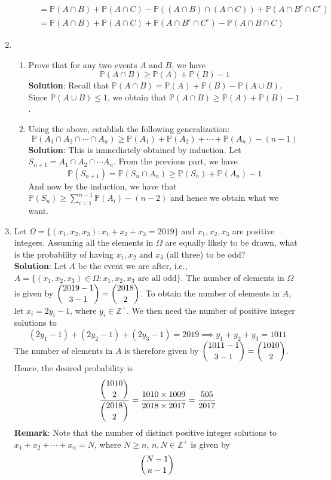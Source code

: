 \documentclass{article}
\newcommand{\dsum}{\displaystyle\sum}
\newcommand{\dcup}{\displaystyle\cup}
\newcommand{\dcap}{\displaystyle\cap}
\newcommand{\Pb}{\mathbb{P}}
\newcommand{\Zb}{\mathbb{Z}}
\newcommand{\bkt}[1]{\left(#1\right)}
\newcommand{\soln}[1]{\textbf{Solution}: #1}
\begin{document}
\begin{enumerate}
\begin{enumerate}
{\begin{align}
				& = \Pb\bkt{A \dcap B} + \Pb\bkt{A \dcap C} - \Pb\bkt{\bkt{A \dcap B} \dcap \bkt{A \dcap C}} + \Pb \bkt{A \dcap B^c \dcap C^c}\\
				& = \Pb\bkt{A \dcap B} + \Pb\bkt{A \dcap C} + \Pb\bkt{A \dcap B^c \dcap C^c} - \Pb\bkt{A \dcap B \dcap C}
			\end{align}
			}
		\end{enumerate}
		\item
		\begin{enumerate}
			\item
			Prove that for any two events $A$ and $B$, we have
			$$\Pb\bkt{A \dcap B} \geq \Pb(A) + \Pb(B) - 1$$
			\soln{
			Recall that $\Pb\bkt{A \dcap B} = \Pb(A) + \Pb(B) - \Pb\bkt{A \dcup B}$. Since $\Pb\bkt{A \dcup B} \leq 1$, we obtain that
			$\Pb\bkt{A \dcap B} \geq \Pb(A) + \Pb(B) - 1$.
			}
			\item
			Using the above, establish the following generalization:
			$$\Pb\bkt{A_1 \dcap A_2 \dcap \cdots \dcap A_n} \geq \Pb\bkt{A_1} + \Pb\bkt{A_2} + \cdots + \Pb\bkt{A_n} - \bkt{n-1}$$
			\soln{
			This is immediately obtained by induction. Let $S_{n+1} = A_1 \dcap A_2 \dcap \cdots A_{n}$. From the previous part, we have
			$$\Pb\bkt{S_{n+1}} = \Pb \bkt{S_n \dcap A_n} \geq \Pb\bkt{S_n} + \Pb\bkt{A_n} - 1$$
			And now by the induction, we have that $\Pb\bkt{S_n} \geq \dsum_{i=1}^{n-1} \Pb \bkt{A_i} - \bkt{n-2}$ and hence we obtain what we want.
			}
		\end{enumerate}
		\item
		Let $\Omega = \{\bkt{x_1,x_2,x_3}: x_1+x_2+x_3 = 2019\}$ and $x_1,x_2,x_3$ are positive integers. Assuming all the elements in $\Omega$ are equally likely to be drawn, what is the probability of having $x_1,x_2$ and $x_3$ (all three) to be odd?\\
		\soln{Let $A$ be the event we are after, i.e., $A = \{\bkt{x_1,x_2,x_3} \in \Omega: x_1,x_2,x_3 \text{ are all odd}\}$. The number of elements in $\Omega$ is given by $\dbinom{2019-1}{3-1} = \dbinom{2018}2$. To obtain the number of elements in $A$, let $x_i = 2y_i-1$, where $y_i \in \Zb^+$. We then need the number of positive integer solutions to
		$$\bkt{2y_1-1} + \bkt{2y_2-1} + \bkt{2y_3-1} = 2019 \implies y_1 + y_2 + y_3 = 1011$$
		The number of elements in $A$ is therefore given by $\dbinom{1011-1}{3-1} = \dbinom{1010}2$. Hence, the desired probability is
		$$\dfrac{\dbinom{1010}2}{\dbinom{2018}2} = \dfrac{1010 \times 1009}{2018 \times 2017} = \dfrac{505}{2017}$$
		\textbf{Remark}: Note that the number of distinct positive integer solutions to $x_1+x_2+\cdots+x_n = N$, where $N \geq n$, $n,N \in \Zb^+$ is given by $$\dbinom{N-1}{n-1}$$
}
\end{enumerate}
\end{document}
